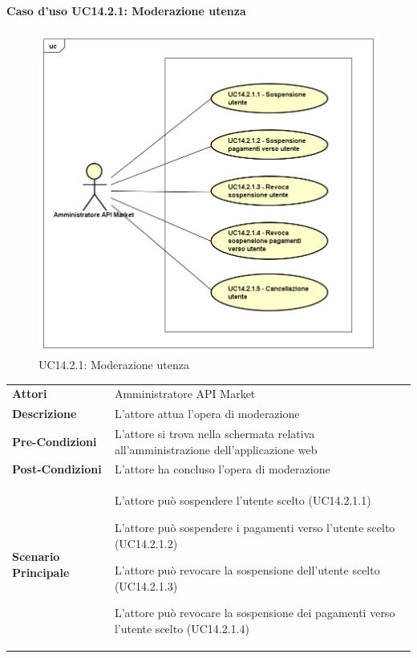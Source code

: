 \newpage
\paragraph{Caso d'uso UC14.2.1: Moderazione utenza}
\label{UC14_2_1}
\begin{figure}[ht]
	\centering
	\includegraphics[scale=0.45]{UML/UC14_2_1.png}
	\caption{UC14.2.1: Moderazione utenza}
\end{figure}

\begin{minipage}{\linewidth}
	\begin{tabular}{ l | p{11cm}}
		\hline
		\rowcolor{Gray}
		\multicolumn{2}{c}{UC14.2.1 - Moderazione utenza} \\
		\hline
		\textbf{Attori} &  Amministratore API Market \\
		\textbf{Descrizione} & L'attore attua l'opera di moderazione \\
		\textbf{Pre-Condizioni} & L'attore si trova nella schermata relativa all'amministrazione dell'applicazione web \\
		\textbf{Post-Condizioni} & L'attore ha concluso l'opera di moderazione \\
		\textbf{Scenario Principale} & 
		\begin{enumerate*}[label=(\arabic*.),itemjoin={\newline}]
			\item L'attore può sospendere l'utente scelto (UC14.2.1.1)
			\item L'attore può sospendere i pagamenti verso l'utente scelto (UC14.2.1.2)
			\item L'attore può revocare la sospensione dell'utente scelto (UC14.2.1.3)
			\item L'attore può revocare la sospensione dei pagamenti verso l'utente scelto (UC14.2.1.4)
		\end{enumerate*}\\
	\end{tabular}
\end{minipage}

